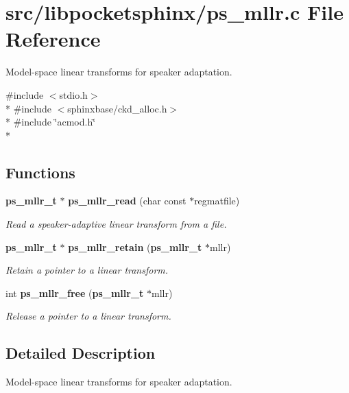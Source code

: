 \section{src/libpocketsphinx/ps\+\_\+mllr.c File Reference}
\label{ps__mllr_8c}


Model-\/space linear transforms for speaker adaptation.  


{\ttfamily \#include $<$stdio.\+h$>$}\\*
{\ttfamily \#include $<$sphinxbase/ckd\+\_\+alloc.\+h$>$}\\*
{\ttfamily \#include \char`\"{}acmod.\+h\char`\"{}}\\*
\subsection*{Functions}
\begin{DoxyCompactItemize}
\item 
{\bf ps\+\_\+mllr\+\_\+t} $\ast$ {\bf ps\+\_\+mllr\+\_\+read} (char const $\ast$regmatfile)\label{ps__mllr_8c_ab62fb9c8cf3bdeed75a7ac2870d56a5a}

\begin{DoxyCompactList}\small\item\em Read a speaker-\/adaptive linear transform from a file. \end{DoxyCompactList}\item 
{\bf ps\+\_\+mllr\+\_\+t} $\ast$ {\bf ps\+\_\+mllr\+\_\+retain} ({\bf ps\+\_\+mllr\+\_\+t} $\ast$mllr)\label{ps__mllr_8c_ae21e7d8a0fa751aaccc5ef39dc5d1fe0}

\begin{DoxyCompactList}\small\item\em Retain a pointer to a linear transform. \end{DoxyCompactList}\item 
int {\bf ps\+\_\+mllr\+\_\+free} ({\bf ps\+\_\+mllr\+\_\+t} $\ast$mllr)\label{ps__mllr_8c_a240194a6ef30b01da38e3654c984b017}

\begin{DoxyCompactList}\small\item\em Release a pointer to a linear transform. \end{DoxyCompactList}\end{DoxyCompactItemize}


\subsection{Detailed Description}
Model-\/space linear transforms for speaker adaptation. 

